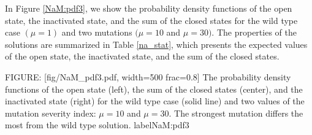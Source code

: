 In Figure \ref{NaM:pdf3}, we show the
probability density functions of the open state, the inactivated state, and the
sum of the closed states for the wild type case $(\mu=1)$ and two mutations
$(\mu=10$ and $\mu=30).$ The properties of the solutions are summarized in
Table \ref{na_stat}, which presents the expected values of the open state, the
inactivated state, and the sum of the closed states.


FIGURE: [fig/NaM_pdf3.pdf, width=500 frac=0.8] The probability density functions of the open state (left),
the sum of the closed states  (center), and the inactivated state (right) 
for the wild type case (solid line) and two values of the mutation severity 
index: $\mu=10$ and $\mu=30$. The strongest mutation differs the most
from the wild type solution. 
 label{NaM:pdf3}%



